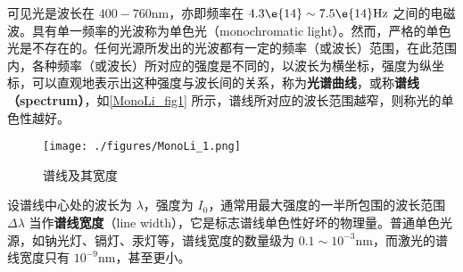 

可见光是波长在 $400-760\mathrm{nm}$，亦即频率在 $4.3\e{14} \sim 7.5\e{14} \mathrm{Hz}$ 之间的电磁波。具有单一频率的光波称为单色光（monochromatic light）。然而，严格的单色光是不存在的。任何光源所发出的光波都有一定的频率（或波长）范围，在此范围内，各种频率（或波长）所对应的强度是不同的，以波长为横坐标，强度为纵坐标，可以直观地表示出这种强度与波长间的关系，称为\textbf{光谱曲线}，或称\textbf{谱线（spectrum）}，如\autoref{MonoLi_fig1} 所示，谱线所对应的波长范围越窄，则称光的单色性越好。
\begin{figure}[ht]
\centering
\texttt{[image: ./figures/MonoLi\_1.png]}
\caption{谱线及其宽度} \label{MonoLi_fig1}
\end{figure}

设谱线中心处的波长为 $\lambda$，强度为 $I_0$，通常用最大强度的一半所包围的波长范围 $\Delta\lambda$ 当作\textbf{谱线宽度}（line width），它是标志谱线单色性好坏的物理量。普通单色光源，如钠光灯、镉灯、汞灯等，谱线宽度的数量级为 $0.1 \sim 10^{-3} \mathrm{nm}$，而激光的谱线宽度只有 $10^{-9}\mathrm{nm}$，甚至更小。
